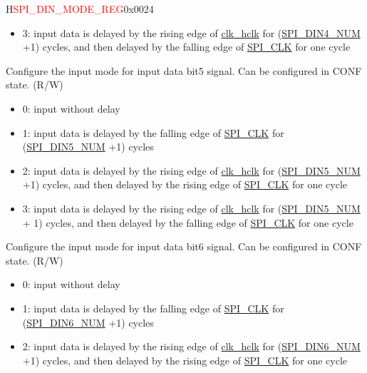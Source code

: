 \begin{register}{H}{\textcolor{red}{SPI\_DIN\_MODE\_REG}}{0x{}0024}
\begin{regdesc}
\begin{reglist}
\begin{itemize}
    \item 3: input data is delayed by the rising edge of \hyperref[clk:clkhclk]{clk\_hclk} for (\hyperref[fielddesc:SPIDIN4NUM]{SPI\_DIN4\_NUM} +1) cycles, and then delayed by the falling edge of \hyperref[clk:SPICLK]{SPI\_CLK} for one cycle
\end{itemize}

\label{fielddesc:SPIDIN5MODE}\item [\textcolor{red}{SPI\_DIN5\_MODE (for SPI2 only)}] Configure the input mode for input data bit5 signal. Can be configured in CONF state. (R/W)

\begin{itemize}
    \item 0: input without delay
    \item 1: input data is delayed by the falling edge of \hyperref[clk:SPICLK]{SPI\_CLK} for (\hyperref[fielddesc:SPIDIN5NUM]{SPI\_DIN5\_NUM} +1) cycles

    \item 2: input data is delayed by the rising edge of \hyperref[clk:clkhclk]{clk\_hclk} for (\hyperref[fielddesc:SPIDIN5NUM]{SPI\_DIN5\_NUM} +1) cycles, and then delayed by the rising edge of \hyperref[clk:SPICLK]{SPI\_CLK} for one cycle

    \item 3: input data is delayed by the rising edge of \hyperref[clk:clkhclk]{clk\_hclk} for (\hyperref[fielddesc:SPIDIN5NUM]{SPI\_DIN5\_NUM} + 1) cycles, and then delayed by the falling edge of \hyperref[clk:SPICLK]{SPI\_CLK} for one cycle
\end{itemize}

\label{fielddesc:SPIDIN6MODE}\item [\textcolor{red}{SPI\_DIN6\_MODE (for SPI2 only)}] Configure the input mode for input data bit6 signal. Can be configured in CONF state. (R/W)

\begin{itemize}
    \item 0: input without delay
    \item 1: input data is delayed by the falling edge of \hyperref[clk:SPICLK]{SPI\_CLK} for (\hyperref[fielddesc:SPIDIN6NUM]{SPI\_DIN6\_NUM} +1) cycles

    \item 2: input data is delayed by the rising edge of \hyperref[clk:clkhclk]{clk\_hclk} for (\hyperref[fielddesc:SPIDIN6NUM]{SPI\_DIN6\_NUM} +1) cycles, and then delayed by the rising edge of \hyperref[clk:SPICLK]{SPI\_CLK} for one cycle


\end{itemize}
\end{reglist}
\end{regdesc}
\end{register}
